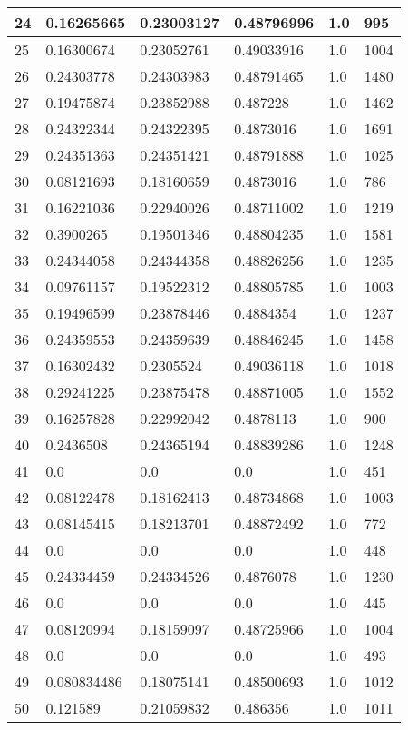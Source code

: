 \begin{longtable}{|l|l|l|l|l|l|}
24 & 0.16265665 & 0.23003127 & 0.48796996 & 1.0 & 995 \\ \hline 
25 & 0.16300674 & 0.23052761 & 0.49033916 & 1.0 & 1004 \\ \hline 
26 & 0.24303778 & 0.24303983 & 0.48791465 & 1.0 & 1480 \\ \hline 
27 & 0.19475874 & 0.23852988 & 0.487228 & 1.0 & 1462 \\ \hline 
28 & 0.24322344 & 0.24322395 & 0.4873016 & 1.0 & 1691 \\ \hline 
29 & 0.24351363 & 0.24351421 & 0.48791888 & 1.0 & 1025 \\ \hline 
30 & 0.08121693 & 0.18160659 & 0.4873016 & 1.0 & 786 \\ \hline 
31 & 0.16221036 & 0.22940026 & 0.48711002 & 1.0 & 1219 \\ \hline 
32 & 0.3900265 & 0.19501346 & 0.48804235 & 1.0 & 1581 \\ \hline 
33 & 0.24344058 & 0.24344358 & 0.48826256 & 1.0 & 1235 \\ \hline 
34 & 0.09761157 & 0.19522312 & 0.48805785 & 1.0 & 1003 \\ \hline 
35 & 0.19496599 & 0.23878446 & 0.4884354 & 1.0 & 1237 \\ \hline 
36 & 0.24359553 & 0.24359639 & 0.48846245 & 1.0 & 1458 \\ \hline 
37 & 0.16302432 & 0.2305524 & 0.49036118 & 1.0 & 1018 \\ \hline 
38 & 0.29241225 & 0.23875478 & 0.48871005 & 1.0 & 1552 \\ \hline 
39 & 0.16257828 & 0.22992042 & 0.4878113 & 1.0 & 900 \\ \hline 
40 & 0.2436508 & 0.24365194 & 0.48839286 & 1.0 & 1248 \\ \hline 
41 & 0.0 & 0.0 & 0.0 & 1.0 & 451 \\ \hline 
42 & 0.08122478 & 0.18162413 & 0.48734868 & 1.0 & 1003 \\ \hline 
43 & 0.08145415 & 0.18213701 & 0.48872492 & 1.0 & 772 \\ \hline 
44 & 0.0 & 0.0 & 0.0 & 1.0 & 448 \\ \hline 
45 & 0.24334459 & 0.24334526 & 0.4876078 & 1.0 & 1230 \\ \hline 
46 & 0.0 & 0.0 & 0.0 & 1.0 & 445 \\ \hline 
47 & 0.08120994 & 0.18159097 & 0.48725966 & 1.0 & 1004 \\ \hline 
48 & 0.0 & 0.0 & 0.0 & 1.0 & 493 \\ \hline 
49 & 0.080834486 & 0.18075141 & 0.48500693 & 1.0 & 1012 \\ \hline 
50 & 0.121589 & 0.21059832 & 0.486356 & 1.0 & 1011 \\ \hline 
\end{longtable}